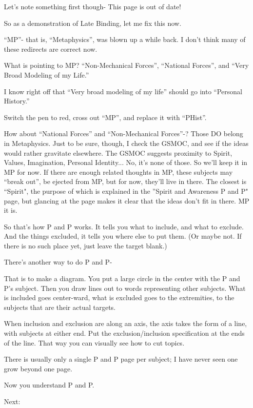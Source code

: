 \documentclass[oneside]{book}
\begin{document}
Let's note something first though-
This page is out of date!

So as a demonstration of Late Binding, let me fix this now.

``MP''- that is, ``Metaphysics'', was blown up a while back. I don't think
many of these redirects are correct now.

What is pointing to MP? ``Non-Mechanical Forces'', ``National Forces'',
and ``Very Broad Modeling of my Life.''

I know right off that ``Very broad modeling of my life'' should go into
``Personal History.''

Switch the pen to red, cross out ``MP'', and replace it with ``PHist''.

How about ``National Forces'' and ``Non-Mechanical Forces''-? Those DO
belong in Metaphysics. Just to be sure, though, I check the GSMOC, and
see if the ideas would rather gravitate elsewhere. The GSMOC suggests
proximity to Spirit, Values, Imagination, Personal Identity... No,
it's none of those. So we'll keep it in MP for now. If there are
enough related thoughts in MP, these subjects may ``break out'', be
ejected from MP, but for now, they'll live in there. The closest is
``Spirit", the purpose of which is explained in the ''Spirit and Awareness
P and P" page, but glancing at the page makes it clear that the ideas
don't fit in there. MP it is.

So that's how P and P works. It tells you what to include, and what to
exclude. And the things excluded, it tells you where else to put
them. (Or maybe not. If there is no such place yet, just leave the
target blank.)

There's another way to do P and P-

That is to make a diagram. You put a large circle in the center with
the P and P's subject. Then you draw lines out to words representing other
subjects. What is included goes center-ward, what is excluded goes to
the extremities, to the subjects that are their actual targets.

When inclusion and exclusion are along an axis, the axis takes the
form of a line, with subjects at either end. Put the
exclusion/inclusion specification at the ends of the line. That way
you can visually see how to cut topics.

There is usually only a single P and P page per subject; I have never seen
one grow beyond one page.

Now you understand P and P.

Next:
\end{document}
